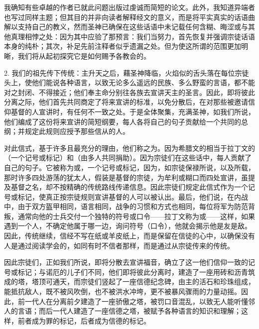 我确知有些卓越的作者已就此问题出版过虔诚而简短的论文。此外，我知道异端者也写过同样主题；但其目的并非向读者解释经文的意义，而是将平实真实的话语曲解以支持自己的教义，然而圣神已确保在这些话语中未记载任何含糊、晦涩或与其他真理相悖之处：因为其中应验了那预言：我们当努力，首先恢复并强调宗徒话语本身的纯朴；其次，补足先前注释者似乎遗漏之处。但为使这所谓的范围更加明晰，我们将从起初探究它是如何赐予各教会的。\par

2. 我们的祖先传下传统：主升天之后，藉圣神降临，火焰似的舌头落在每位宗徒头上，使他们能说各种语言，以致无论多么遥远的民族、多么野蛮的言语，都不能对之封闭、不得接近；他们奉主命分别往各族去宣讲天主的圣言。因此，即将彼此分离之际，他们首先共同商定了将来宣讲的标准，以免分散后，在对那些被邀请信仰基督的人宣讲时，有任何不一致之处。于是全体聚集，充满圣神，如我们所说，他们编成了这份将来宣讲的简短纲要，每人各将自己的句子贡献给一个共同的总纲；并规定此规则应授予那些信从的人。\par

对此信式，基于许多且最充分的理由，他们称之为。因为希腊文的相当于拉丁文的（一个记号或标记）和（由多人共同捐助）。因为宗徒们在这些话中，每人贡献了自己的句子。它被称为或，一个记号或标记，因为，如宗徒保禄所说，以及所载，那时许多四处游荡的犹太人，假装是基督的宗徒，为牟利或糊口而四处宣讲，虽提及基督之名，却不按精确的传统路线传递信息。因此宗徒们规定此信式作为一个记号或标记，使真正按宗徒规则宣讲基督的人可以被认出。最后，他们说，在内战中，由于双方盔甲相同，语言相同，战争的习惯和方式也相同，每位将军为防范背叛，通常向他的士兵交付一个独特的符号或口令——拉丁文称为或——这样，如果遇到一个人，不确定他属于哪一边，询问符号（口令），他就会揭示他是友是敌。因此，传统继续，信经不写在纸或羊皮纸上，而是保留在信徒的心中，以确保没有人是通过阅读学会的，如同有时不信者那样，而是通过从宗徒传来的传统。\par

因此宗徒们，正如我们所说，即将分散去宣讲福音，确立了这一他们信仰一致的记号或标记；与诺厄的儿子们不同，他们即将彼此分离时，建造了一座用砖和沥青筑成的塔，塔顶可通天，而宗徒们竖起了一座信德纪念碑，由主的活石和珍珠组成，能抵抗敌人，既不被风吹倒，也不被洪水冲垮，更不被暴风骤雨的力量动摇。因此，前一代人在分离前夕建造了一座骄傲之塔，被罚口音混乱，以致无人能听懂邻人的言语；而后一代人建造了一座信德之塔，被赋予各种语言的知识和理解；这样，前者成为罪的标记，后者成为信德的标记。\par

